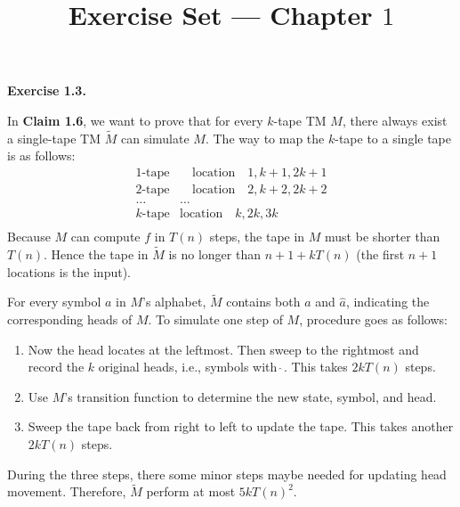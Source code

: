 \documentclass[a4paper]{article}
\title{Exercise Set --- Chapter $1$}
\date{}
\newenvironment{exercise}[1]{
	\par
	\noindent\textbf{Exercise #1.}\quad
}{
	\par
	\bigskip
}
\begin{document}
\maketitle

\begin{exercise}{1.3}
	In \textbf{Claim 1.6}, we want to prove that for every $k$-tape TM $M$,
    there always exist a single-tape TM $\widetilde{M}$ can simulate $M$.
    The way to map the $k$-tape to a single tape is as follows:
		$$
        \begin{matrix}		
            1\text{-tape}&\quad \text{location}\quad 1, k+1, 2k+1\\			
             2\text{-tape}&\quad \text{location}\quad 2, k+2, 2k+2\\			
			 \dots&\dots\\			
             k\text{-tape}&\text{location}\quad k, 2k, 3k\\			
		\end{matrix}
        $$
	Because $M$ can compute $f$ in $T(n)$ steps, the tape in $M$ must be shorter than $T(n)$.
    Hence the tape in $\widetilde{M}$ is no longer than $n+1+kT(n)$ (the first $n+1$ locations is the input).

	For every symbol $a$ in $M$'s alphabet, $\widetilde{M}$ contains both $a$ and $\widehat{a}$, 
    indicating the corresponding heads of $M$. 
	To simulate one step of $M$, procedure goes as follows:
    \begin{enumerate}
        \item Now the head locates at the leftmost.
            Then sweep to the rightmost and record the $k$ original heads, i.e., symbols with $\widehat{\ }$. 
            This takes $2kT(n)$ steps.
        \item Use $M$'s transition function to determine the new state, symbol, and head.
        \item Sweep the tape back from right to left to update the tape. 
            This takes another $2kT(n)$ steps.
    \end{enumerate}
	During the three steps, there some minor steps maybe needed for updating head movement. 
	Therefore, $\widetilde{M}$ perform at most $5kT(n)^2$. 
\end{exercise}
\end{document}
